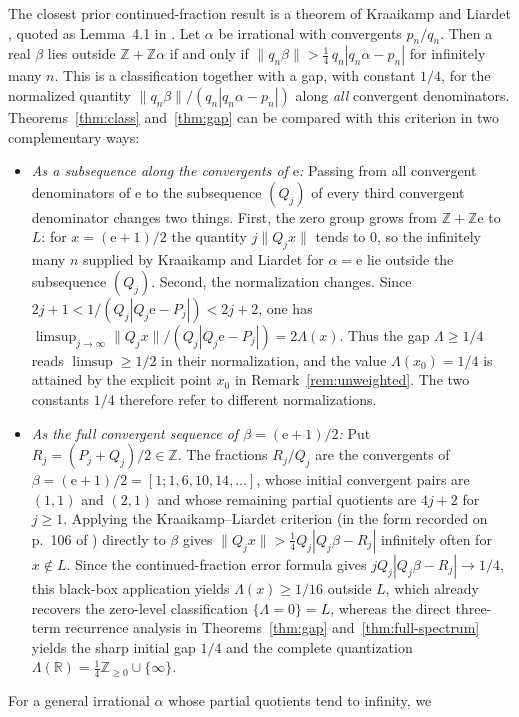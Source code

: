 \documentclass[11pt]{article}
\theoremstyle{definition}
\theoremstyle{remark}
\newcommand{\R}{\mathbb{R}}
\newcommand{\Z}{\mathbb{Z}}
\newcommand{\ee}{\mathrm{e}}
\newcommand{\Lam}{\Lambda}
\begin{document}
The closest prior continued-fraction result is a theorem of Kraaikamp and
Liardet \cite{KL}, quoted as Lemma~4.1 in \cite{BDS}. Let $\alpha$ be irrational
with convergents $p_n/q_n$. Then a real $\beta$ lies outside
$\Z+\Z\alpha$ if and only if
$\|q_n\beta\|>\tfrac14\,q_n|q_n\alpha-p_n|$ for infinitely many $n$. This
is a classification together with a gap, with constant $1/4$, for the
normalized quantity $\|q_n\beta\|/(q_n|q_n\alpha-p_n|)$ along \emph{all}
convergent denominators. Theorems~\ref{thm:class} and~\ref{thm:gap} can be
compared with this criterion in two complementary ways:
\begin{itemize}[leftmargin=1.8em]
\item \emph{As a subsequence along the convergents of $\ee$:} Passing from all
convergent denominators of $\ee$ to the subsequence $(Q_j)$ of every third
convergent denominator changes two things. First, the zero group grows from
$\Z+\Z\ee$ to $L$: for $x=(\ee+1)/2$ the quantity $j\|Q_jx\|$ tends to $0$, so
the infinitely many $n$ supplied by Kraaikamp and Liardet for $\alpha=\ee$ lie
outside the subsequence $(Q_j)$. Second, the normalization changes. Since
$2j+1<1/(Q_j|Q_j\ee-P_j|)<2j+2$, one has
$\limsup_{j\to\infty}\|Q_jx\|/(Q_j|Q_j\ee-P_j|)=2\Lam(x)$. Thus the gap
$\Lam\ge1/4$ reads $\limsup\ge1/2$ in their normalization, and the value
$\Lam(x_0)=1/4$ is attained by the explicit point $x_0$ in
Remark~\ref{rem:unweighted}. The two constants $1/4$ therefore refer to
different normalizations.
\item \emph{As the full convergent sequence of $\beta=(\ee+1)/2$:} Put
$R_j=(P_j+Q_j)/2\in\Z$. The fractions $R_j/Q_j$ are the convergents of
$\beta=(\ee+1)/2=[1;1,6,10,14,\dots]$, whose initial convergent pairs are
$(1,1)$ and $(2,1)$ and whose remaining partial quotients are $4j+2$ for
$j\ge1$. Applying the Kraaikamp--Liardet criterion \cite{KL} (in the form
recorded on p.~106 of \cite{BDS}) directly to $\beta$ gives
$\|Q_jx\|>\tfrac14 Q_j|Q_j\beta-R_j|$ infinitely often for $x\notin L$. Since
the continued-fraction error formula gives $jQ_j|Q_j\beta-R_j|\to1/4$, this
black-box application yields $\Lam(x)\ge1/16$ outside $L$, which already
recovers the zero-level classification $\{\Lam=0\}=L$, whereas the direct
three-term recurrence analysis in Theorems~\ref{thm:gap}
and~\ref{thm:full-spectrum} yields the sharp initial gap $1/4$ and the complete
quantization $\Lam(\R)=\frac14\Z_{\ge0}\cup\{\infty\}$.
\end{itemize}
For a general irrational $\alpha$ whose partial quotients tend to infinity, we
\end{document}
